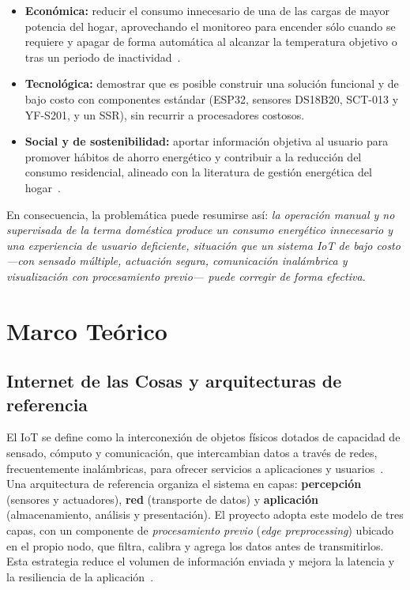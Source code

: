 \documentclass[11pt,a4paper]{article}
\begin{document}
\begin{itemize}
  \item \textbf{Económica:} reducir el consumo innecesario de una de las cargas de mayor potencia del hogar, aprovechando el monitoreo para encender sólo cuando se requiere y apagar de forma automática al alcanzar la temperatura objetivo o tras un periodo de inactividad~\cite{bhati2017}.
  \item \textbf{Tecnológica:} demostrar que es posible construir una solución funcional y de bajo costo con componentes estándar (ESP32, sensores DS18B20, SCT-013 y YF-S201, y un SSR), sin recurrir a procesadores costosos.
  \item \textbf{Social y de sostenibilidad:} aportar información objetiva al usuario para promover hábitos de ahorro energético y contribuir a la reducción del consumo residencial, alineado con la literatura de gestión energética del hogar~\cite{ford2017,zipperer2013,marikyan2019}.
\end{itemize}

En consecuencia, la problemática puede resumirse así: \emph{la operación manual y no supervisada de la terma doméstica produce un consumo energético innecesario y una experiencia de usuario deficiente, situación que un sistema IoT de bajo costo ---con sensado múltiple, actuación segura, comunicación inalámbrica y visualización con procesamiento previo--- puede corregir de forma efectiva.}

\section{Marco Teórico}
\label{sec:marco}

\subsection{Internet de las Cosas y arquitecturas de referencia}
El IoT se define como la interconexión de objetos físicos dotados de capacidad de sensado, cómputo y comunicación, que intercambian datos a través de redes, frecuentemente inalámbricas, para ofrecer servicios a aplicaciones y usuarios~\cite{alfuqaha2015}. Una arquitectura de referencia organiza el sistema en capas: \textbf{percepción} (sensores y actuadores), \textbf{red} (transporte de datos) y \textbf{aplicación} (almacenamiento, análisis y presentación). El proyecto adopta este modelo de tres capas, con un componente de \emph{procesamiento previo} (\emph{edge preprocessing}) ubicado en el propio nodo, que filtra, calibra y agrega los datos antes de transmitirlos. Esta estrategia reduce el volumen de información enviada y mejora la latencia y la resiliencia de la aplicación~\cite{shi2016}.
\end{document}
